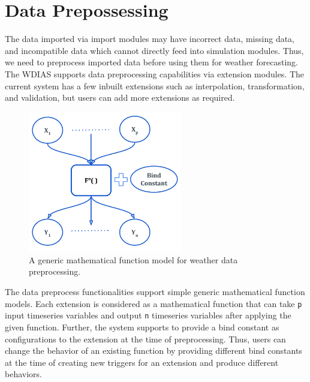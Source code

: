 \section{Data Prepossessing}
\label{se:data_preprocess}

The data imported via import modules may have incorrect data, missing data, and incompatible data which cannot directly feed into simulation modules.
Thus, we need to preprocess imported data before using them for weather forecasting. The WDIAS supports data preprocessing capabilities via extension modules. The current system has a few inbuilt extensions such as interpolation, transformation, and validation, but users can add more extensions as required.

\begin{figure}[htp]
    \centering
    \includegraphics[width=0.6\textwidth]{method/data_preprocess/weather_data_preprocessing.pdf}
    \caption{A generic mathematical function model for weather data preprocessing.}
    \label{fi:weather_data_preprocessing}
\end{figure}

The data preprocess functionalities support simple generic mathematical function models. Each extension is considered as a mathematical function that can take \texttt{p} input timeseries variables and output \texttt{n} timeseries variables after applying the given function. Further, the system supports to provide a bind constant as configurations to the extension at the time of preprocessing. Thus, users can change the behavior of an existing function by providing different bind constants at the time of creating new triggers for an extension and produce different behaviors. 

